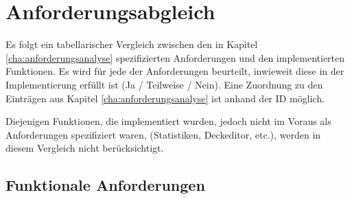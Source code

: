 \chapter{Anforderungsabgleich}
\label{cha:anforderungsabgleich}

Es folgt ein tabellarischer Vergleich zwischen den in Kapitel \ref{cha:anforderungsanalyse} spezifizierten Anforderungen und den implementierten Funktionen. Es wird für jede der Anforderungen beurteilt, inwieweit diese in der Implementierung erfüllt ist (Ja / Teilweise / Nein). Eine Zuordnung zu den Einträgen aus Kapitel \ref{cha:anforderungsanalyse} ist anhand der ID möglich.

Diejenigen Funktionen, die implementiert wurden, jedoch nicht im Voraus als Anforderungen spezifiziert waren,  (Statistiken, Deckeditor, etc.), werden in diesem Vergleich nicht berücksichtigt.

\clearpage

\section{Funktionale Anforderungen}
\label{sec:anforderungsabgleich:funktional}

\setlength{\tabcolsep}{10pt}
\renewcommand{\arraystretch}{1.3}

